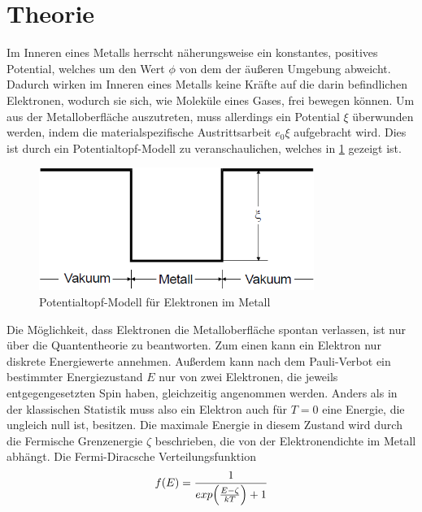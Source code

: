 \section{Theorie}
\label{sec:Theorie}
Im Inneren eines Metalls herrscht näherungsweise ein konstantes, positives Potential, welches um den Wert $\phi$
von dem der äußeren Umgebung abweicht. Dadurch wirken im Inneren eines Metalls keine Kräfte auf die darin 
befindlichen Elektronen, wodurch sie sich, wie Moleküle eines Gases, frei bewegen können. Um aus der Metalloberfläche
auszutreten, muss allerdings ein Potential $\xi $ überwunden werden, indem die materialspezifische Austrittsarbeit
$ e_0\xi$ aufgebracht wird. Dies ist durch ein Potentialtopf-Modell zu veranschaulichen, welches in  \ref{fig:pottopf}
gezeigt ist. 
 \begin{figure}
     \centering
     \includegraphics[height=4cm]{data/pottopf.png}
     \caption{Potentialtopf-Modell für Elektronen im Metall}
     \label{fig:pottopf}
 \end{figure}
\FloatBarrier
Die Möglichkeit, dass Elektronen die Metalloberfläche spontan verlassen, ist nur über die Quantentheorie zu beantworten.
Zum einen kann ein Elektron nur diskrete Energiewerte annehmen. Außerdem kann nach dem Pauli-Verbot ein bestimmter Energiezustand $E$ nur von zwei 
Elektronen, die jeweils entgegengesetzten Spin haben, gleichzeitig angenommen werden. Anders als in der klassischen Statistik muss also ein Elektron
auch für $T=0$ eine Energie, die ungleich null ist, besitzen. Die maximale Energie in diesem Zustand wird durch die Fermische Grenzenergie $\zeta$
beschrieben, die von der Elektronendichte im Metall abhängt. 
Die Fermi-Diracsche Verteilungsfunktion
\begin{equation}
    f(E) = \frac{1}{exp \Bigl(\frac{E-\zeta}{kT}\Bigr) +1}
\end{equation}

